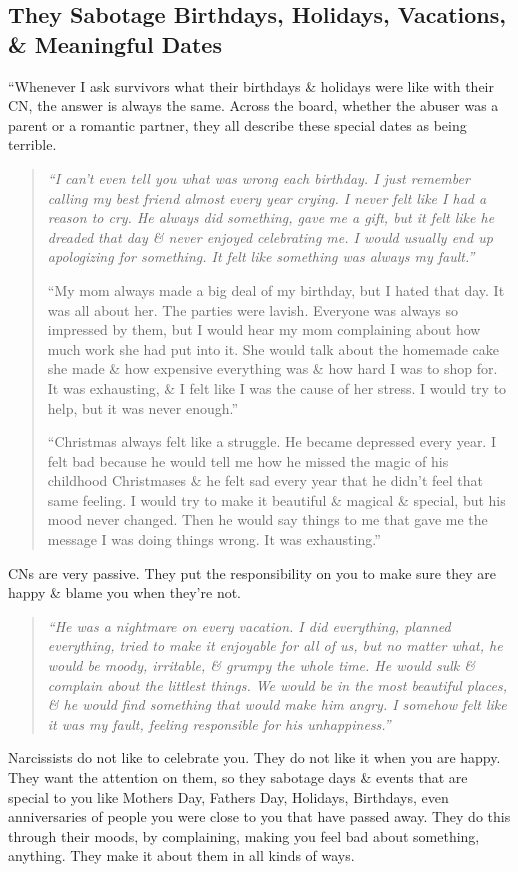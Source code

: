 \documentclass{article}
\numberwithin{equation}{section}
\begin{document}
\subsection{They Sabotage Birthdays, Holidays, Vacations, \& Meaningful Dates}
``Whenever I ask survivors what their birthdays \& holidays were like with their CN, the answer is always the same. Across the board, whether the abuser was a parent or a romantic partner, they all describe these special dates as being terrible.
\begin{quotation}\it
	``I can't even tell you what was wrong each birthday. I just remember calling my best friend almost every year crying. I never felt like I had a reason to cry. He always did something, gave me a gift, but it felt like he dreaded that day \& never enjoyed celebrating me. I would usually end up apologizing for something. It felt like something was always my fault.''
	
	``My mom always made a big deal of my birthday, but I hated that day. It was all about her. The parties were lavish. Everyone was always so impressed by them, but I would hear my mom complaining about how much work she had put into it. She would talk about the homemade cake she made \& how expensive everything was \& how hard I was to shop for. It was exhausting, \& I felt like I was the cause of her stress. I would try to help, but it was never enough.''
	
	``Christmas always felt like a struggle. He became depressed every year. I felt bad because he would tell me how he missed the magic of his childhood Christmases \& he felt sad every year that he didn't feel that same feeling. I would try to make it beautiful \& magical \& special, but his mood never changed. Then he would say things to me that gave me the message I was doing things wrong. It was exhausting.''
\end{quotation}
CNs are very passive. They put the responsibility on you to make sure they are happy \& blame you when they're not.
\begin{quotation}\it
	``He was a nightmare on every vacation. I did everything, planned everything, tried to make it enjoyable for all of us, but no matter what, he would be moody, irritable, \& grumpy the whole time. He would sulk \& complain about the littlest things. We would be in the most beautiful places, \& he would find something that would make him angry. I somehow felt like it was my fault, feeling responsible for his unhappiness.''
\end{quotation}
Narcissists do not like to celebrate you. They do not like it when you are happy. They want the attention on them, so they sabotage days \& events that are special to you like Mothers Day, Fathers Day, Holidays, Birthdays, even anniversaries of people you were close to you that have passed away. They do this through their moods, by complaining, making you feel bad about something, anything. They make it about them in all kinds of ways.
\end{document}
